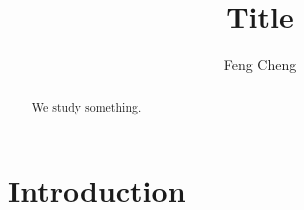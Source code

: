 \documentclass[12pt,draft]{amsart}
\title{Title}
\author{Feng Cheng}
\theoremstyle{plain}
\theoremstyle{definition}
\theoremstyle{remark}
\theoremstyle{plain}
\begin{document}
\begin{abstract}
    We study something.
\end{abstract}

\maketitle

\section{Introduction}
\end{document}
